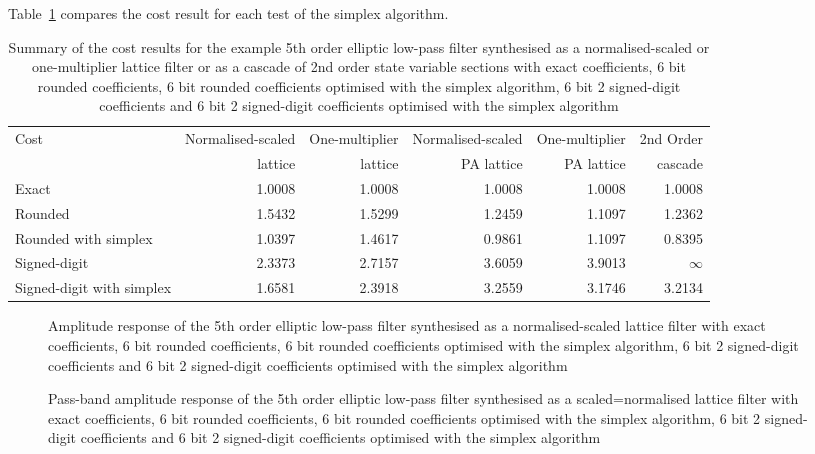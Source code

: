 \documentclass[a4paper,twoside,10pt,english]{report}
\begin{document}
Table~\ref{tab:simplex-algorithm-cost-summary} compares the cost result for
each test of the simplex algorithm.
\begin{table}[!hb]
\centering
\begin{threeparttable}
\begin{tabular}{lrrrrr} \toprule
Cost&Normalised-scaled&One-multiplier&Normalised-scaled&One-multiplier&2nd Order\\
&lattice&lattice&PA lattice&PA lattice& cascade\\
\midrule
Exact                         & 1.0008 & 1.0008 & 1.0008 & 1.0008 & 1.0008 \\
Rounded                       & 1.5432 & 1.5299 & 1.2459 & 1.1097 & 1.2362 \\
Rounded with simplex          & 1.0397 & 1.4617 & 0.9861 & 1.1097 & 0.8395 \\
Signed-digit                  & 2.3373 & 2.7157 & 3.6059 & 3.9013 & $\infty$ \\
Signed-digit with simplex     & 1.6581 & 2.3918 & 3.2559 & 3.1746 & 3.2134 \\
\bottomrule
\end{tabular}
\end{threeparttable}
\caption[Summary of cost results for each simplex algorithm example]
{Summary of the cost results for the example 5th order
elliptic low-pass filter synthesised as a normalised-scaled or one-multiplier 
lattice filter or as a cascade of 2nd order state variable sections
with exact coefficients, 6 bit rounded coefficients,
6 bit rounded coefficients optimised with the simplex algorithm,
6 bit 2 signed-digit coefficients and 6 bit
2 signed-digit coefficients optimised with the simplex algorithm}
\label{tab:simplex-algorithm-cost-summary}
\end{table}
\begin{figure}[!htbp]
\begin{center}
\scalebox{0.7}{}
\caption{Amplitude response of the 5th order elliptic low-pass
filter synthesised as a normalised-scaled lattice filter with exact
coefficients, 6 bit rounded coefficients, 6 bit rounded coefficients
optimised with the simplex algorithm, 6 bit 2 signed-digit coefficients and
6 bit 2 signed-digit coefficients optimised with the simplex algorithm}
\label{fig:simplex_NS_lattice_response}
\end{center}
\end{figure}
\begin{figure}[!htbp]
\begin{center}
\scalebox{0.7}{}
\caption{Pass-band amplitude response of the 5th order elliptic low-pass
filter synthesised as a scaled=normalised lattice filter with exact
coefficients, 6 bit rounded coefficients, 6 bit rounded coefficients
optimised with the simplex algorithm, 6 bit 2 signed-digit coefficients and
6 bit 2 signed-digit coefficients optimised with the simplex algorithm}
\label{fig:simplex_NS_lattice_passband_response}
\end{center}
\end{figure}
\end{document}
